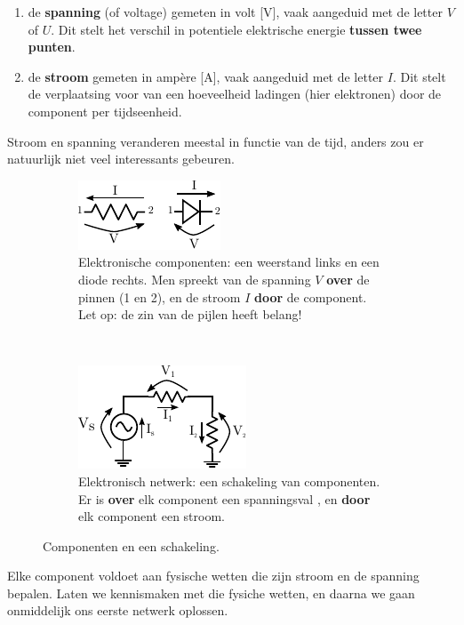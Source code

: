 \documentclass{article}
\begin{document}
\begin{enumerate}
	\item de \textbf{spanning} (of voltage) gemeten in volt [V], vaak aangeduid met de letter $V$ of $U$. Dit stelt het verschil in potentiele elektrische energie \textbf{tussen twee punten}.
	\item de \textbf{stroom} gemeten in ampère [A], vaak aangeduid met de letter $I$. Dit stelt de verplaatsing voor van een hoeveelheid ladingen (hier elektronen) door de component per tijdseenheid.
\end{enumerate}

Stroom en spanning veranderen meestal in functie van de tijd, anders zou er natuurlijk niet veel interessants gebeuren. 

\begin{figure}[hbtp]
	\centering
	\begin{subfigure}[b]{0.45\linewidth}
		\centering
		\includegraphics[width=0.8\linewidth]{componenten}
		\caption{Elektronische componenten: een weerstand links en een diode rechts. Men spreekt van de spanning $V$ \textbf{over} de pinnen (1 en 2), en de stroom $I$ \textbf{door} de component. Let op: de zin van de pijlen heeft belang!}
		\label{subfig:componenten}
	\end{subfigure}
	~
	\begin{subfigure}[b]{0.45\linewidth}
		\centering
		\includegraphics[width=0.8\linewidth]{weerstandsdeler}
		\caption{Elektronisch netwerk: een schakeling van componenten. Er is \textbf{over} elk component een spanningsval , en \textbf{door} elk component een stroom.}
		\label{subfig:netwerk}
	\end{subfigure}
	\caption{Componenten en een schakeling. }
	\label{fig:component_en_schakeling}
\end{figure}
 Elke component voldoet aan fysische wetten die zijn stroom en de spanning bepalen. Laten we kennismaken met die fysiche wetten, en daarna we gaan onmiddelijk ons eerste netwerk oplossen.
\end{document}
